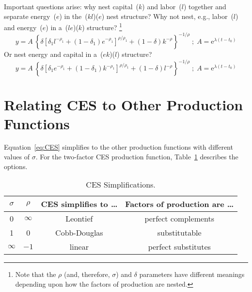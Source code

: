 \documentclass[preprint,authoryear,12pt]{elsarticle}
\begin{document}
Important questions arise: why nest capital~($k$) and labor~($l$) together 
and separate energy~($e$)
in the~($kl$)($e$) nest structure?
Why not nest, e.g., labor~($l$) and energy~($e$) in a~($le$)($k$) structure?%
  \footnote{
  Note that the $\rho$ (and, therefore, $\sigma$) and $\delta$ parameters have different
  meanings depending upon how the factors of production are nested.
  }%
%
\begin{equation} \label{eq:CES-lek}
  y = A \: \left\{\delta \left[\delta_1 l^{-\rho_1} 
      + (1-\delta_1) e^{-\rho_1} \right]^{\rho/\rho_1} 
      + (1-\delta) k^{-\rho} \right\}^{-1/\rho} \; ; \; 
      A = \mathrm{e}^{\lambda (t-t_0)}
\end{equation}
%
Or nest energy and capital in a~($ek$)($l$) structure?
%
\begin{equation} \label{eq:CES-ekl}
  y = A \: \left\{\delta \left[\delta_1 e^{-\rho_1} 
      + (1-\delta_1) k^{-\rho_1} \right]^{\rho/\rho_1} 
      + (1-\delta) l^{-\rho} \right\}^{-1/\rho} \; ; \; 
      A = \mathrm{e}^{\lambda (t-t_0)}
\end{equation}


\section{Relating CES to Other Production Functions} 
\label{sec:CES-others}

Equation~\ref{eq:CES} simplifies to the other production functions 
with different values of $\sigma$.
For the two-factor CES production function, 
Table~\ref{tab:ces_simplifications} describes the options.

\begin{table}
\caption[CES Simplifications]{CES Simplifications.}
\begin{center}
 \begin{tabular}{ c c c c }
\toprule 
$\sigma$ & $\rho$ & CES simplifies to \dots & Factors of production are \dots \\
\midrule
0        & $\infty$ & Leontief              & perfect complements             \\
1        & 0        & Cobb-Douglas          & substitutable                   \\
$\infty$ & $-1$     & linear                & perfect substitutes             \\
\bottomrule
\end{tabular}
\end{center}
\label{tab:ces_simplifications}
\end{table}
\end{document}
